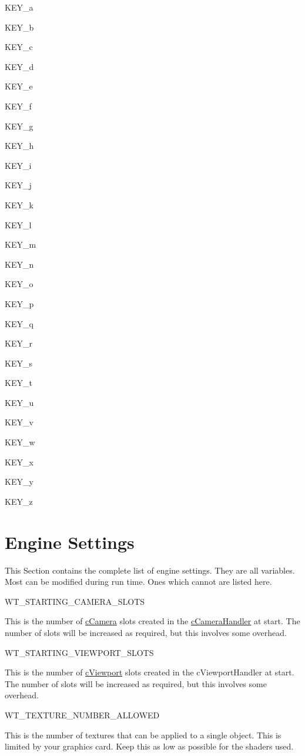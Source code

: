 KEY\_\-a \par
 KEY\_\-b \par
 KEY\_\-c \par
 KEY\_\-d \par
 KEY\_\-e \par
 KEY\_\-f \par
 KEY\_\-g \par
 KEY\_\-h \par
 KEY\_\-i \par
 KEY\_\-j \par
 KEY\_\-k \par
 KEY\_\-l \par
 KEY\_\-m \par
 KEY\_\-n \par
 KEY\_\-o \par
 KEY\_\-p \par
 KEY\_\-q \par
 KEY\_\-r \par
 KEY\_\-s \par
 KEY\_\-t \par
 KEY\_\-u \par
 KEY\_\-v \par
 KEY\_\-w \par
 KEY\_\-x \par
 KEY\_\-y \par
 KEY\_\-z \par
\hypertarget{_reference_lists_EngineSettingsPage}{}\section{Engine Settings}\label{_reference_lists_EngineSettingsPage}
This Section contains the complete list of engine settings. They are all variables. Most can be modified during run time. Ones which cannot are listed here.
\begin{DoxyItemize}
\item WT\_\-STARTING\_\-CAMERA\_\-SLOTS
\begin{DoxyItemize}
\item This is the number of \hyperlink{classc_camera}{cCamera} slots created in the \hyperlink{classc_camera_handler}{cCameraHandler} at start. The number of slots will be increased as required, but this involves some overhead.
\end{DoxyItemize}
\item WT\_\-STARTING\_\-VIEWPORT\_\-SLOTS
\begin{DoxyItemize}
\item This is the number of \hyperlink{classc_viewport}{cViewport} slots created in the cViewportHandler at start. The number of slots will be increased as required, but this involves some overhead.
\end{DoxyItemize}
\item WT\_\-TEXTURE\_\-NUMBER\_\-ALLOWED
\begin{DoxyItemize}
\item This is the number of textures that can be applied to a single object. This is limited by your graphics card. Keep this as low as possible for the shaders used.
\end{DoxyItemize}
\end{DoxyItemize}
